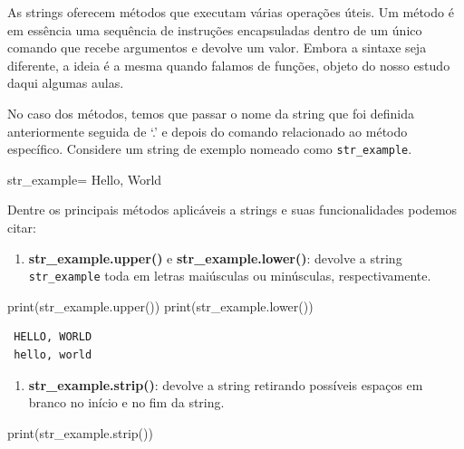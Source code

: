 \documentclass[
  brazilian,
  letterpaper,
  DIV=11,
  numbers=noendperiod]{scrreprt}
\newenvironment{Shaded}{\begin{snugshade}}{\end{snugshade}}
\newcommand{\BuiltInTok}[1]{\textcolor[rgb]{0.00,0.23,0.31}{#1}}
\newcommand{\NormalTok}[1]{\textcolor[rgb]{0.00,0.23,0.31}{#1}}
\newcommand{\OperatorTok}[1]{\textcolor[rgb]{0.37,0.37,0.37}{#1}}
\newcommand{\StringTok}[1]{\textcolor[rgb]{0.13,0.47,0.30}{#1}}
\providecommand{\tightlist}{%
  \setlength{\itemsep}{0pt}\setlength{\parskip}{0pt}}
\begin{document}
As strings oferecem métodos que executam várias operações úteis. Um
método é em essência uma sequência de instruções encapsuladas dentro de
um único comando que recebe argumentos e devolve um valor. Embora a
sintaxe seja diferente, a ideia é a mesma quando falamos de funções,
objeto do nosso estudo daqui algumas aulas.

No caso dos métodos, temos que passar o nome da string que foi definida
anteriormente seguida de `.' e depois do comando relacionado ao método
específico. Considere um string de exemplo nomeado como
\texttt{str\_example}.

\begin{Shaded}
\begin{Highlighting}[]
\NormalTok{str\_example}\OperatorTok{=}\StringTok{\textquotesingle{} Hello, World\textquotesingle{}}
\end{Highlighting}
\end{Shaded}

Dentre os principais métodos aplicáveis a strings e suas funcionalidades
podemos citar:

\begin{enumerate}
\def\labelenumi{\arabic{enumi}.}
\tightlist
\item
  \textbf{str\_example.upper()} e \textbf{str\_example.lower()}: devolve
  a string \texttt{str\_example} toda em letras maiúsculas ou
  minúsculas, respectivamente.
\end{enumerate}

\begin{Shaded}
\begin{Highlighting}[]
\BuiltInTok{print}\NormalTok{(str\_example.upper())}
\BuiltInTok{print}\NormalTok{(str\_example.lower())}
\end{Highlighting}
\end{Shaded}

\begin{verbatim}
 HELLO, WORLD
 hello, world
\end{verbatim}

\begin{enumerate}
\def\labelenumi{\arabic{enumi}.}
\setcounter{enumi}{1}
\tightlist
\item
  \textbf{str\_example.strip()}: devolve a string retirando possíveis
  espaços em branco no início e no fim da string.
\end{enumerate}

\begin{Shaded}
\begin{Highlighting}[]
\BuiltInTok{print}\NormalTok{(str\_example.strip())}
\end{Highlighting}
\end{Shaded}
\end{document}
